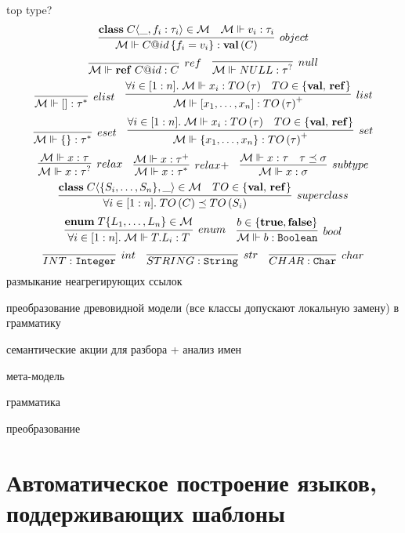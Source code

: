 top type?
\newcommand{\classf}[3]{\mathbf{class}\; #1 \langle #2, #3\rangle}
\newcommand{\type}[2]{#1\left(#2\right)}
\newcommand{\valts}{\mathbf{val}}
\newcommand{\valt}[1]{\type{\valts}{#1}}
\newcommand{\refts}{\mathbf{ref}}
\newcommand{\reft}[1]{\type{\refts}{#1}}
\newcommand{\refv}[2]{\mathbf{ref}\; #1@#2}
\newcommand{\reference}[3]{\mathbf{#1}\langle #2 : #3\rangle}
\newcommand{\attribute}[2]{\mathbf{attr}\langle #1 : #2\rangle}
\newcommand{\obj}[3]{#1@#2\left\{#3\right\}}
\newcommand{\fromMM}{\MM{M} \Vdash}
$$
	\infer[object]{
		\fromMM \obj{C}{id}{f_i = v_i} : \valt{C}
	}{
		\classf{C}{\_}{f_i : \tau_i} \in \MM{M}&
		\fromMM v_i : \tau_i
	}
$$
$$
\infer[ref]{
	\fromMM \refv{C}{id} : C
}{}
\quad
\infer[null]{
	\fromMM NULL : \tau^?
}{}
$$
$$
\infer[elist]{
	\fromMM [] : \tau^*
}{}
\quad
\infer[list]{
	\fromMM [x_1, \ldots, x_n] : \type{TO}{\tau}^+
}{
	\forall i\in[1:n]. \; \fromMM x_i : \type{TO}{\tau} &
	TO \in \{\valts,\, \refts\}
}
$$
$$
\infer[eset]{
	\fromMM \{\} : \tau^*
}{}
\quad
\infer[set]{
	\fromMM \{x_1, \ldots, x_n\} : \type{TO}{\tau}^+
}{
	\forall i\in[1:n]. \; \fromMM x_i : \type{TO}{\tau} &
	TO \in \{\valts,\, \refts\}
}
$$
$$
\infer[relax]{
	\fromMM x : \tau^?
}{
	\fromMM x : \tau
}
\quad
\infer[relax+]{
	\fromMM x : \tau^*
}{
	\fromMM x : \tau^+
}
\quad
\infer[subtype]{
	\fromMM x : \sigma
}{
	\fromMM x : \tau &
	\tau \preceq \sigma
}
$$
$$
\infer[superclass]{
	\forall i \in [1:n].\; \type{TO}{C} \preceq \type{TO}{S_i}
}{
	\classf{C}{\{S_i, \ldots, S_n\}}{\_} \in \MM{M} &
	TO \in \{\valts,\, \refts\}
}
$$
$$
\infer[enum]{
	\forall i \in [1:n]. \; \fromMM T.L_i : T
}{
	\mathbf{enum}\;T\{L_1,\ldots,L_n\} \in \MM{M}
}
\quad
\infer[bool]{
	\fromMM b : \mathtt{Boolean}
}{
	b \in \{\mathbf{true}, \mathbf{false}\}
}
$$
$$
\infer[int]{INT : \mathtt{Integer}}{}
\quad
\infer[str]{STRING : \mathtt{String}}{}
\quad
\infer[char]{CHAR : \mathtt{Char}}{}
$$
размыкание неагрегирующих ссылок

преобразование древовидной модели (все классы допускают локальную замену) в грамматику

семантические акции для разбора + анализ имен

мета-модель

грамматика

преобразование

\chapter{Автоматическое построение языков, поддерживающих шаблоны}

